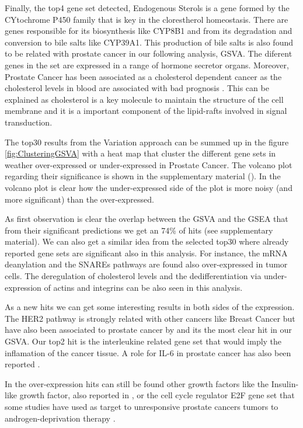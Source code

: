 \documentclass[9pt,twocolumn,twoside]{gsajnl}
\begin{document}
Finally, the top4 gene set detected, Endogenous Sterols is a gene formed by the CYtochrome P450 family that is key in the clorestherol homeostasis. There are genes responsible for its biosynthesis like CYP8B1 and from its degradation and conversion to bile salts like CYP39A1. This production of bile salts is also found to be related with prostate cancer in our following analysis, GSVA. The diferent genes in the set are expressed in a range of hormone secretor organs. Moreover, Prostate Cancer has been associated as a cholesterol dependent cancer as the cholesterol levels in blood are associated with bad prognosis \cite{krycer2013cholesterol}. This can be explained as cholesterol is a key molecule to  maintain the structure of the cell membrane and it is a important component of the lipid-rafts involved in signal transduction.


The top30 results from the Variation approach can be summed up in the figure \ref{fig:ClusteringGSVA} with a heat map that cluster the different gene sets in weather over-expressed or under-expressed in Prostate Cancer. The volcano plot regarding their significance is shown in the supplementary material (). In the volcano plot is clear how the under-expressed side of the plot is more noisy (and more significant) than the over-expressed.

As first observation is clear the overlap between the GSVA and the GSEA that from their significant predictions we get an 74\% of hits (see supplementary material). We can also get a similar idea from the selected top30 where already reported gene sets are significant also in this analysis. For instance, the mRNA deanylation and the SNAREs pathways are found also over-expressed in tumor cells. The deregulation of cholesterol levels and the dedifferentiation via under-expression of actins and integrins can be also seen in this analysis.

As a new hits we can get some interesting results in both sides of the expression. The HER2 pathway is strongly related with other cancers like Breast Cancer but have also been associated to prostate cancer by \cite{yeh1999her2} and its the most clear hit in our GSVA. Our top2 hit is the interleukine related gene set that would imply the inflamation of the cancer tissue. A role for IL-6 in prostate cancer has also been reported \citep{chung1999characterization}.

In the over-expression hits can still be found other growth factors like the Insulin-like growth factor, also reported in \cite{hellawell2002expression}, or the cell cycle regulator E2F gene set that some studies have used as target to unresponsive prostate cancers tumors to androgen-deprivation therapy \citep{kaseb2007androgen}.
\end{document}
